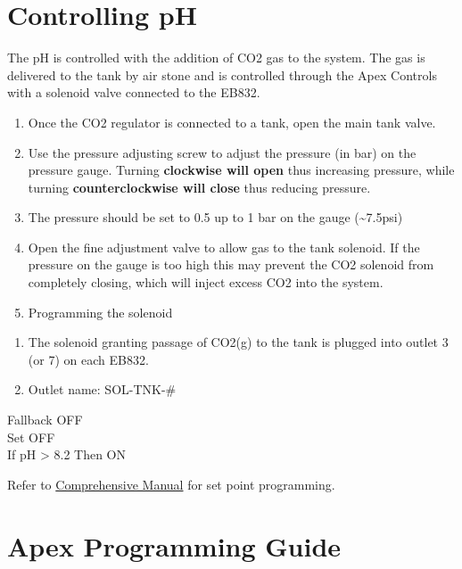 \documentclass[]{book}
\providecommand{\tightlist}{%
  \setlength{\itemsep}{0pt}\setlength{\parskip}{0pt}}
\begin{document}
\chapter{Controlling pH}\label{controlling-ph}

The pH is controlled with the addition of CO2 gas to the system. The gas
is delivered to the tank by air stone and is controlled through the Apex
Controls with a solenoid valve connected to the EB832.

\begin{enumerate}
\def\labelenumi{\arabic{enumi}.}
\tightlist
\item
  Once the CO2 regulator is connected to a tank, open the main tank
  valve.
\item
  Use the pressure adjusting screw to adjust the pressure (in bar) on
  the pressure gauge. Turning \textbf{clockwise will open} thus
  increasing pressure, while turning \textbf{counterclockwise will
  close} thus reducing pressure.
\item
  The pressure should be set to 0.5 up to 1 bar on the gauge
  (\textasciitilde{}7.5psi)
\item
  Open the fine adjustment valve to allow gas to the tank solenoid. If
  the pressure on the gauge is too high this may prevent the CO2
  solenoid from completely closing, which will inject excess CO2 into
  the system.
\item
  Programming the solenoid\\
\end{enumerate}

\begin{enumerate}
\def\labelenumi{\alph{enumi}.}
\tightlist
\item
  The solenoid granting passage of CO2(g) to the tank is plugged into
  outlet 3 (or 7) on each EB832.\\
\item
  Outlet name: SOL-TNK-\#
\end{enumerate}

Fallback OFF\\
Set OFF\\
If pH \textgreater{} 8.2 Then ON

Refer to
\href{/Manuals/Apex_Comprehensive_Reference_Manual.pdf}{Comprehensive
Manual} for set point programming.

\chapter{Apex Programming Guide}\label{apex-programming-guide}
\end{document}
